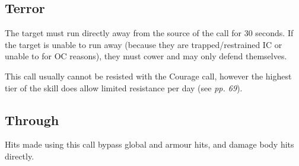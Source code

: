 \subsection{Terror}

The target must run directly away from the source of the call for 30 seconds. If the target is unable to run away (because they are trapped/restrained IC or unable to for OC reasons), they must cower and may only defend themselves.

This call usually cannot be resisted with the Courage call, however the highest tier of the skill does allow limited resistance per day (see \textit{pp. 69}).

\subsection{Through}

Hits made using this call bypass global and armour hits, and damage body hits directly.
